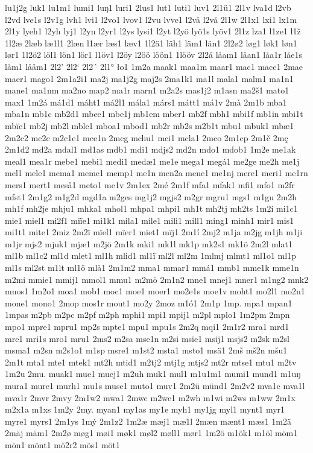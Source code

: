 lu1j2g
luk1
lu1m1
lumi1
luŋ1
luri1
2lus1
lut1
luti1
luv1
2l1ü1
2l1v
lva1d
l2vb
l2vd
lve1s
l2v1g
lvh1
lvi1
l2vo1
lvov1
l2vu
lvve1
l2vä
l2vå
2l1w
2l1x1
lxi1
lx1m
2l1y
lyeh1
l2yh
lyj1
l2yn
l2yr1
l2ys
lysi1
l2yt
l2yö
lyö1s
lyöv1
2l1z
lza1
l1ze1
l1ž
1l2æ
2læb
læ1l1
2læn
l1ær
læs1
læv1
1l2ä1
läh1
läm1
län1
2l2ø2
løg1
løk1
løn1
lør1
1l2ö2
löl1
lön1
lör1
l1öv1
l2öy
l2öö
löön1
1lööv
2l2å
låam1
låan1
låa1r
låe1s
låm1
lååm1
2l2'
2l2`
2l2´
2l1°
ło1
1m2a
maak1
maa1m
maar1
mac1
macc1
2mae
maer1
mago1
2m1a2i1
ma2j
ma1j2g
maj2s
2ma1k1
ma1l
mala1
malm1
ma1n1
mane1
ma1nm
ma2no
map2
ma1r
marn1
m2a2s
mas1j2
m1asn
ma2š1
mato1
max1
1m2á
má1d1
máht1
má2l1
mála1
márs1
mátt1
má1v
2mà
2m1b
mba1
mba1n
mb1c
mb2d1
mbee1
mbe1j
mb1em
mber1
mb2f
mbh1
mbi1f
mb1in
mbi1t
mbïe1
mb2j
mb2l
mble1
mboa1
mbod1
mb2r
mb2s
m2b1t
mbu1
mbuk1
mbæ1
2m2c2
mc2c
m2c1e1
mce1n
2mcg
mchu1
mci1
mcla1
2mco
2m1cp
2m1č
2mç
2m1d2
md2a
mdal1
md1as
mdb1
mdi1
mdjs2
md2n
mdo1
mdob1
1m2e
me1ak
meal1
mea1r
mebe1
mebi1
medi1
medæ1
me1e
mega1
megá1
me2ge
me2h
me1j
mel1
mele1
mema1
meme1
memp1
me1n
men2a
mene1
me1nj
mere1
meri1
me1rn
mers1
mert1
meså1
meto1
me1v
2m1ex
2mé
2m1f
mfa1
mfak1
mfi1
mfo1
m2fr
mfst1
2m1g2
m1g2d
mgd1a
m2ges
mg1j2
mgjs2
m2gr
mgru1
mgs1
m1gu
2m2h
mh1f
mh2je
mhju1
mhka1
mhol1
mhpa1
mhpi1
mh1t
mh2tj
mh2ts
1m2i
mi1c1
mie1
miel1
mi2f1
miïe1
mi1k1
mila1
mile1
mili1
mill1
ming1
minh1
mir1
mis1
mi1t1
mite1
2miz
2m2ï
mïel1
mïer1
mïet1
mïj1
2m1í
2mj2
m1ja
m2jg
m1jh
m1ji
m1jr
mjs2
mjuk1
mjæ1
m2jö
2m1k
mki1
mk1l
mk1p
mk2s1
mk1ö
2m2l
mlat1
ml1b
ml1c2
ml1d
mlet1
ml1h
mlid1
ml1ï
ml2l
ml2m
1mlmj
mlmt1
ml1o1
ml1p
ml1s
ml2st
m1lt
ml1ö
mlå1
2m1m2
mma1
mmar1
mmá1
mmb1
mme1k
mme1n
m2mi
mmie1
mmij1
mmol1
mmu1
m2mö
2m1n2
mne1
mnej1
mner1
m1ng2
mnk2
mnos1
1m2o1
moa1
mob1
moc1
moe1
moer1
mo2e1s
moe1v
moht1
mo2l1
mo2n1
mone1
mono1
2mop
mos1r
mout1
mo2y
2moz
m1ó1
2m1p
1mp.
mpa1
mpan1
1mpas
m2pb
m2pc
m2pf
m2ph
mphi1
mpi1
mpij1
m2pl
mplo1
1m2pm
2mpn
mpo1
mpre1
mpru1
mp2s
mpte1
mpu1
mpu1s
2m2q
mqi1
2m1r2
mra1
mrd1
mre1
mri1s
mro1
mru1
2ms2
m2sa
mse1n
m2si
msie1
msij1
msjs2
m2sk
m2sl
msma1
m2sn
m2s1o1
m1sp
msre1
m1st2
msta1
msto1
msä1
2mš
mš2n
mšu1
2m1t
mta1
mte1
mtek1
mt2h
mtid1
m2tj2
mtj1g
mtjs2
mt2r
mtse1
mtu1
m2tv
1m2u
2mu.
muak1
mue1
muej1
m2uh
muk1
mul1
m1u1m1
mumi1
mund1
m1uŋ
mura1
mure1
murh1
mu1s
muse1
muto1
muv1
2m2ü
münd1
2m2v2
mva1e
mva1l
mva1r
2mvr
2mvy
2m1w2
mwa1
2mwc
m2we1
m2wh
m1wi
m2ws
m1ww
2m1x
m2x1a
m1xs
1m2y
2my.
myan1
my1as
my1e
myh1
my1jg
myl1
mynt1
myr1
myre1
myrs1
2m1ys
1mý
2m1z2
1m2æ
mæj1
mæ1l
2mæn
mænt1
mæs1
1m2ä
2mäj
mäm1
2m2ø
møg1
møi1
møk1
møl2
møll1
mør1
1m2ö
m1ök1
m1öl
möm1
mön1
mönt1
mö2r2
mös1
möt1
